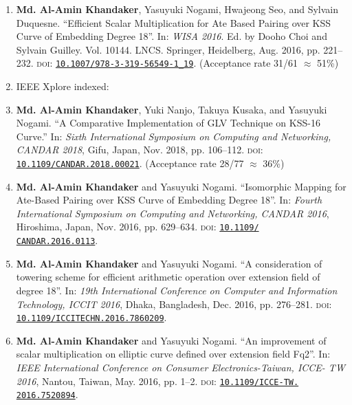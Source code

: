 \documentclass{article}[paper=a4,10pt]
\begin{document}
\begin{enumerate}
	\item \textbf{Md. Al-Amin Khandaker}, Yasuyuki Nogami, Hwajeong Seo, and Sylvain Duquesne. ``Efficient Scalar Multiplication for Ate Based Pairing over KSS Curve of Embedding Degree 18''. In: \textit{WISA 2016}. Ed. by Dooho Choi and Sylvain Guilley. Vol. 10144. LNCS. Springer, Heidelberg, Aug. 2016, pp. 221–232. \textsc{doi}: \href{https://doi.org/10.1007/978-3-319-56549-1\_19}{\texttt{10.1007/978-3-319-56549-1\_19}}.
	(Acceptance rate 31/61 $\approx$ 51\%)
	\vspace{5mm}
	\item[ ] \Large IEEE Xplore indexed:
	\normalsize
	\item \textbf{Md. Al-Amin Khandaker}, Yuki Nanjo, Takuya Kusaka, and Yasuyuki Nogami. ``A Comparative Implementation of GLV Technique on KSS-16 Curve.'' In:  \textit{Sixth International Symposium on Computing and Networking, CANDAR 2018}, Gifu, Japan, Nov. 2018, pp. 106–112. \textsc{doi}: \href{https://doi.org/10.1109/CANDAR.2018.00021}{\texttt{10.1109/CANDAR.2018.00021}}. (Acceptance rate 28/77 $\approx$ 36\%)
	
	\item \textbf{Md. Al-Amin Khandaker} and Yasuyuki Nogami. “Isomorphic Mapping for Ate-Based Pairing over KSS Curve of Embedding Degree 18”. In: \textit{Fourth International Symposium on Computing and Networking, CANDAR 2016}, Hiroshima, Japan, Nov. 2016, pp. 629–634. \textsc{doi}: \href{https://doi.org/10. 1109/CANDAR.2016.0113}{\texttt{10.1109/\\CANDAR.2016.0113}}.
	
	\item  \textbf{Md. Al-Amin Khandaker} and Yasuyuki Nogami. ``A consideration of towering scheme for efficient arithmetic operation over extension field of degree 18''. In: \textit{19th International Conference on Computer and Information Technology, ICCIT 2016}, Dhaka, Bangladesh, Dec. 2016, pp. 276–281. \textsc{doi}: \href{https://doi.org/10.1109/ICCITECHN.2016.7860209}{\texttt{10.1109/ICCITECHN.2016.7860209}}.
	
	\item \textbf{Md. Al-Amin Khandaker} and Yasuyuki Nogami. ``An improvement of scalar multiplication on elliptic curve defined over extension field Fq2''. In: \textit{IEEE International Conference on Consumer Electronics-Taiwan, ICCE- TW 2016}, Nantou, Taiwan, May. 2016, pp. 1–2. \textsc{doi}: \href{https://doi.org/10.1109/ICCE-TW.2016.7520894}{\texttt{10.1109/ICCE-TW.\\2016.7520894}}.
	

\end{enumerate}
\end{document}
